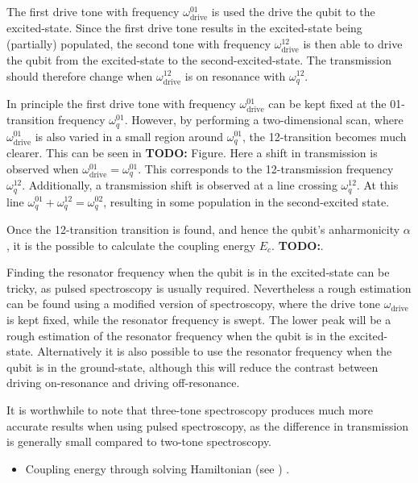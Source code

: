         The first drive tone with frequency $\omega_\text{drive}^{01}$ is used the drive the qubit to the excited-state. Since the first drive tone results in the excited-state being (partially) populated, the second tone with frequency $\omega_\text{drive}^{12}$ is then able to drive the qubit from the excited-state to the second-excited-state. The transmission should therefore change when $\omega_\text{drive}^{12}$ is on resonance with $\omega_q^{12}$.

        In principle the first drive tone with frequency $\omega_\text{drive}^{01}$ can be kept fixed at the 01-transition frequency $\omega_q^{01}$. However, by performing a two-dimensional scan, where $\omega_\text{drive}^{01}$ is also varied in a small region around $\omega_q^{01}$, the 12-transition becomes much clearer. This can be seen in \textbf{TODO:} Figure. Here a shift in transmission is observed when $\omega_\text{drive}^{01} = \omega_q^{01}$. This corresponds to the 12-transmission frequency $\omega_q^{12}$. Additionally, a transmission shift is observed at a line crossing $\omega_q^{12}$. At this line $\omega_q^{01} + \omega_q^{12} = \omega_q^{02}$, resulting in some population in the second-excited state.

        Once the 12-transition transition is found, and hence the qubit's anharmonicity $\alpha$, it is the possible to calculate the coupling energy $E_c$. \textbf{TODO:}.

        Finding the resonator frequency when the qubit is in the excited-state can be tricky, as pulsed spectroscopy is usually required. Nevertheless a rough estimation can be found using a modified version of spectroscopy, where the drive tone $\omega_\text{drive}$ is kept fixed, while the resonator frequency is swept. The lower peak will be a rough estimation of the resonator frequency when the qubit is in the excited-state. Alternatively it is also possible to use the resonator frequency when the qubit is in the ground-state, although this will reduce the contrast between driving on-resonance and driving off-resonance.

        It is worthwhile to note that three-tone spectroscopy produces much more accurate results when using pulsed spectroscopy, as the difference in transmission is generally small compared to two-tone spectroscopy.


        \begin{itemize}
           \item Coupling energy through solving Hamiltonian (see \cite{Reed}) .
        \end{itemize}

